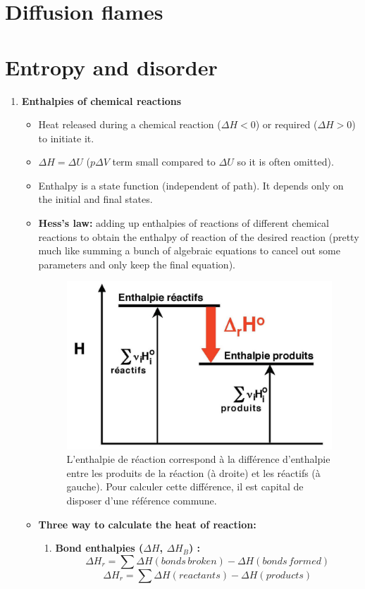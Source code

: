 \documentclass[a4paper,11pt]{article}
\begin{document}
\section{Diffusion flames}
\pagebreak











\appendix
\section{Entropy and disorder}
\begin{enumerate}
\item \textbf{Enthalpies of chemical reactions}
\noindent    
\begin{itemize}
\[\Delta H = H_f - H_i \]
\item Heat released during a chemical reaction ($\Delta H<0$) or required ($\Delta H>0$) to initiate it.
\item $\Delta H = \Delta U$ ($p \Delta V$ term small compared to $\Delta U$ so it is often omitted).
\item Enthalpy is a state function (independent of path). It depends only on the initial and final states.
\item \textbf{Hess's law:} adding up enthalpies of reactions of different chemical reactions to obtain the enthalpy of reaction of the desired reaction (pretty much like summing a bunch of algebraic equations to cancel out some parameters and only keep the final equation).
\begin{figure}[h]
\centering                \includegraphics[width=.4\linewidth]{figures/EtatRefEnthalpie.jpeg}
\caption{L'enthalpie de réaction correspond à la différence d'enthalpie entre les produits de la réaction (à droite) et les réactifs (à gauche). Pour calculer cette différence, il est capital de disposer d'une référence commune.}
\end{figure}
\item \textbf{Three way to calculate the heat of reaction:}
\begin{enumerate}
    \item \textbf{Bond enthalpies ($\Delta H$, $\Delta H_B$) :} 
    \[\Delta H_r = \sum \Delta H(bonds \,broken) - \Delta H(bonds\, formed)\]
    \[\Delta H_r = \sum \Delta H(reactants) - \Delta H(products)\]
    

\end{enumerate}
\end{itemize}
\end{enumerate}
\end{document}
